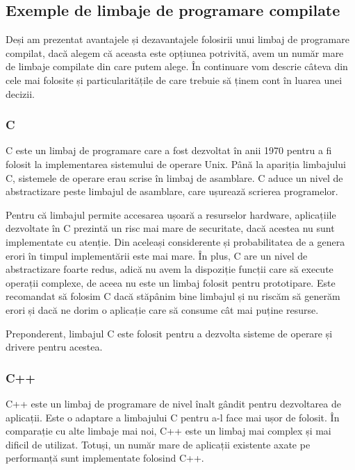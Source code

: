 \subsection{Exemple de limbaje de programare compilate}
\label{sec:appdev:compiled-lang:ex}

Deși am prezentat avantajele și dezavantajele folosirii unui limbaj de
programare compilat, dacă alegem că aceasta este opțiunea potrivită, avem un
număr mare de limbaje compilate din care putem alege. În continuare vom descrie
câteva din cele mai folosite și particularitățile de care trebuie să ținem cont
în luarea unei decizii.

\subsubsection{C}
\label{sec:appdev:compiled-lang:c}

C este un limbaj de programare care a fost dezvoltat în anii 1970 pentru a fi
folosit la implementarea sistemului de operare Unix. Până la apariția limbajului
C, sistemele de operare erau scrise în limbaj de asamblare. C aduce un nivel de
abstractizare peste limbajul de asamblare, care ușurează scrierea programelor.

Pentru că limbajul permite accesarea ușoară a resurselor hardware, aplicațiile
dezvoltate în C prezintă un risc mai mare de securitate, dacă acestea nu sunt implementate cu
atenție. Din aceleași considerente și probabilitatea de a genera erori în timpul
implementării este mai mare. În plus, C are un nivel de abstractizare foarte
redus, adică nu avem la dispoziție funcții care să execute operații complexe, de
aceea nu este un limbaj folosit pentru prototipare. Este recomandat să folosim C
dacă stăpânim bine limbajul și nu riscăm să generăm erori și dacă ne dorim o
aplicație care să consume cât mai puține resurse.

Preponderent, limbajul C este folosit pentru a dezvolta sisteme de operare și
drivere pentru acestea.

\subsubsection{C++}
\label{sec:appdev:compiled-lang:cpp}

C++ este un limbaj de programare de nivel înalt gândit pentru dezvoltarea de
aplicații. Este o adaptare a limbajului C pentru a-l face mai ușor de folosit.
În comparație cu alte limbaje mai noi, C++ este un limbaj mai complex și mai dificil de
utilizat. Totuși, un număr mare de aplicații existente axate pe performanță sunt implementate folosind C++.

